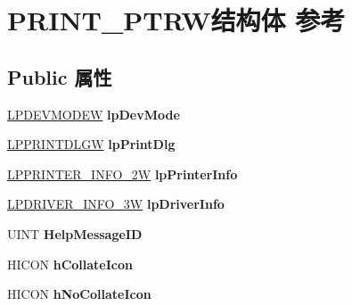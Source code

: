 \hypertarget{struct_p_r_i_n_t___p_t_r_w}{}\section{P\+R\+I\+N\+T\+\_\+\+P\+T\+R\+W结构体 参考}
\label{struct_p_r_i_n_t___p_t_r_w}
\subsection*{Public 属性}
\begin{DoxyCompactItemize}
\item 
\mbox{\label{struct_p_r_i_n_t___p_t_r_w_a4b3772eb6c12a499174af655fa10f435}} 
\hyperlink{struct__devicemode_w}{L\+P\+D\+E\+V\+M\+O\+D\+EW} {\bfseries lp\+Dev\+Mode}
\item 
\mbox{\label{struct_p_r_i_n_t___p_t_r_w_a645d6a5169aee3924f062a9da47d5432}} 
\hyperlink{structtag_p_d_w}{L\+P\+P\+R\+I\+N\+T\+D\+L\+GW} {\bfseries lp\+Print\+Dlg}
\item 
\mbox{\label{struct_p_r_i_n_t___p_t_r_w_a5f8540d64d2a6d63cbd3106c30b550e6}} 
\hyperlink{struct___p_r_i_n_t_e_r___i_n_f_o__2_w}{L\+P\+P\+R\+I\+N\+T\+E\+R\+\_\+\+I\+N\+F\+O\+\_\+2W} {\bfseries lp\+Printer\+Info}
\item 
\mbox{\label{struct_p_r_i_n_t___p_t_r_w_a754c2ac6bb184644cabb6eb66aed9e97}} 
\hyperlink{struct___d_r_i_v_e_r___i_n_f_o__3_w}{L\+P\+D\+R\+I\+V\+E\+R\+\_\+\+I\+N\+F\+O\+\_\+3W} {\bfseries lp\+Driver\+Info}
\item 
\mbox{\label{struct_p_r_i_n_t___p_t_r_w_a614683d553cf3de322cd75f5e517f9aa}} 
U\+I\+NT {\bfseries Help\+Message\+ID}
\item 
\mbox{\label{struct_p_r_i_n_t___p_t_r_w_aeb25cd9774b453d0e4f8eb9a36c5bd5d}} 
H\+I\+C\+ON {\bfseries h\+Collate\+Icon}
\item 
\mbox{\label{struct_p_r_i_n_t___p_t_r_w_abc4d7010d46ed98489a0babc7728575b}} 
H\+I\+C\+ON {\bfseries h\+No\+Collate\+Icon}
\item 

\end{DoxyCompactItemize}
